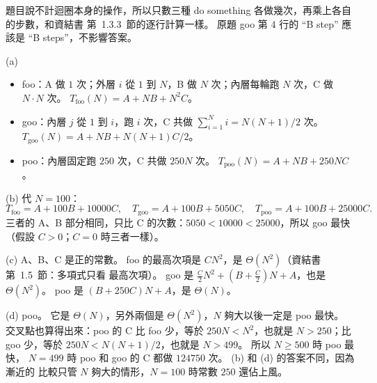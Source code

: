 \begin{pastsoln}
題目說不計迴圈本身的操作，所以只數三種 do something 各做幾次，再乘上各自的步數，和資結書
第~1.3.3~節的逐行計算一樣。 原題 goo 第 4 行的 ``B step'' 應該是 ``B steps''，不影響答案。

(a)
\begin{itemize}
\item foo：A 做 $1$ 次；外層 $i$ 從 $1$ 到 $N$，B 做 $N$ 次；內層每輪跑 $N$ 次，C 做
$N \cdot N$ 次。 $T_{\mathrm{foo}}(N) = A + NB + N^2 C$。
\item goo：內層 $j$ 從 $1$ 到 $i$，跑 $i$ 次，C 共做
$\sum_{i=1}^{N} i = N(N+1)/2$ 次。 $T_{\mathrm{goo}}(N) = A + NB + N(N+1)C/2$。
\item poo：內層固定跑 $250$ 次，C 共做 $250N$ 次。
$T_{\mathrm{poo}}(N) = A + NB + 250NC$。
\end{itemize}

(b) 代 $N = 100$：
\[
T_{\mathrm{foo}} = A + 100B + 10000C,\quad
T_{\mathrm{goo}} = A + 100B + 5050C,\quad
T_{\mathrm{poo}} = A + 100B + 25000C .
\]
三者的 A、B 部分相同，只比 C 的次數：$5050 < 10000 < 25000$，所以 goo 最快（假設
$C > 0$；$C = 0$ 時三者一樣）。

(c) A、B、C 是正的常數。 foo 的最高次項是 $CN^2$，是 $\Theta(N^2)$（資結書第~1.5~節：多項式只看
最高次項）。 goo 是 $\frac{C}{2}N^2 + (B + \frac{C}{2})N + A$，也是 $\Theta(N^2)$。 poo 是
$(B + 250C)N + A$，是 $\Theta(N)$。

(d) poo。 它是 $\Theta(N)$，另外兩個是 $\Theta(N^2)$，$N$ 夠大以後一定是 poo 最快。
交叉點也算得出來：poo 的 C 比 foo 少，等於 $250N < N^2$，也就是 $N > 250$；比 goo
少，等於 $250N < N(N+1)/2$，也就是 $N > 499$。 所以 $N \ge 500$ 時 poo 最快，
$N = 499$ 時 poo 和 goo 的 C 都做 $124750$ 次。 (b) 和 (d) 的答案不同，因為漸近的
比較只管 $N$ 夠大的情形，$N = 100$ 時常數 $250$ 還佔上風。
\end{pastsoln}
